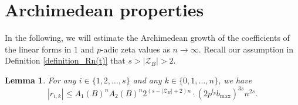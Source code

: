 \documentclass[12pt]{article}
\newtheorem{lemma}[theorem]{Lemma}
\numberwithin{equation}{section}
\begin{document}
\section{Archimedean properties}\label{sec:Archimedean}

In the following, we will estimate the Archimedean growth of the coefficients of the linear forms in $1$ and $p$-adic zeta values as $n\to \infty$. Recall our assumption in Definition \ref{definition_Rn(t)} that $s > |\mathcal{Z}_B| > 2$.

\begin{lemma}\label{lemma_r_ik_estimate}
For any $i \in \{1,2,\ldots,s\}$ and any $k \in \{0,1,\ldots,n\}$, we have
\[  |r_{i,k}| \leqslant A_1(B)^nA_2(B)^n 2^{(s-|\mathcal{Z}_B|+2)n} \cdot (2p^{l_p}b_{\max})^{3s}n^{2s}. \]
\end{lemma}
\end{document}
